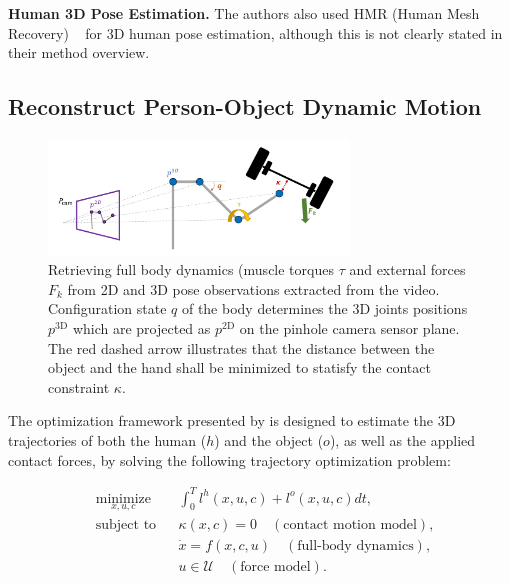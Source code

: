 \noindent\textbf{Human 3D Pose Estimation.} The authors also used HMR (Human Mesh Recovery) ~\cite{kanazawa2018end} for 3D human pose estimation, although this 
is not clearly stated in their method overview.


\subsection{Reconstruct Person-Object Dynamic Motion}
\label{subsec:reconstruct_original}

\begin{figure}[H]
    \centering
    \includegraphics[width=8cm]{figures/original_model_overview.png}
    \caption{Retrieving full body dynamics (muscle torques $\tau$ and external forces $F_{k}$ from 2D and 3D pose observations extracted from the video.
    Configuration state $q$ of the body determines the 3D joints positions $p^{\textrm{3D}}$ which are projected as $p^{\text{2D}}$ on the pinhole camera sensor plane. The red dashed arrow illustrates that the distance between the object and the hand shall be minimized to statisfy the contact constraint $\kappa$.
    }
    \label{fig:original_model_overview}
\end{figure}


The optimization framework presented by \citet{li2019estimating} is designed to estimate the 3D trajectories of both the human ($h$) and the object ($o$), 
as well as the applied contact forces, by solving the following trajectory optimization problem: 

\begin{equation*}
    \begin{aligned}
        & \underset{x,u,c}{\text{minimize}}
        & & \int_{0}^{T} l^h(x, u, c) + l^o(x, u, c)dt, \\
        & \text{subject to}
        & & \kappa(x, c) = 0 \quad (\text{contact motion model}), \\
        &&& \dot{x} = f (x, c, u) \quad (\text{full-body dynamics}), \\
        &&& u \in \mathcal{U} \quad (\text{force model}).
    \end{aligned}
\end{equation*}



